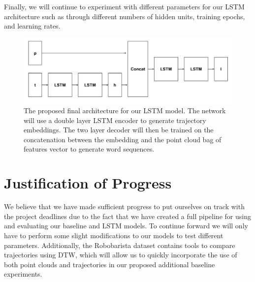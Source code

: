 \documentclass[letterpaper, 12 pt, conference]{ieeeconf}
\begin{document}
Finally, we will continue to experiment with different parameters for our LSTM architecture such as through different numbers of hidden units, training epochs, and learning rates. 

\begin{figure}[h]
\centering
\includegraphics[scale=0.15]{Tuple_LSTM}
\caption{The proposed final architecture for our LSTM model. The network will use a double layer LSTM encoder to generate trajectory embeddings. The two layer decoder will then be trained on the concatenation between the embedding and the point cloud bag of features vector to generate word sequences.}
\end{figure}

\section{Justification of Progress}

We believe that we have made sufficient progress to put ourselves on track with the project deadlines due to the fact that we have created a full pipeline for using and evaluating our baseline and LSTM models. To continue forward we will only have to perform some slight modifications to our models to test different parameters. Additionally, the Robobarista dataset contains tools to compare trajectories using DTW, which will allow us to quickly incorporate the use of both point clouds and trajectories in our proposed additional baseline experiments. 

%



\onecolumn
\end{document}
